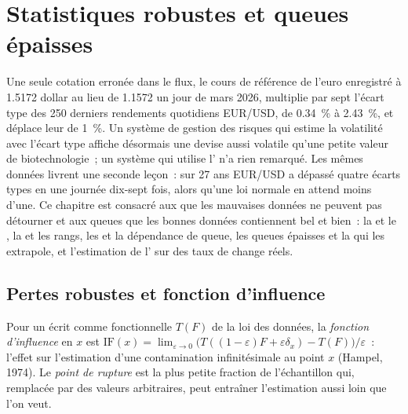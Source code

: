 \chapter{Statistiques robustes et queues épaisses}\label{ch:qm:robust-statistics-and-heavy-tails}

Une seule cotation erronée dans le flux, le cours de référence de l'euro enregistré à 1.5172 dollar au lieu de 1.1572 un jour de mars 2026, multiplie
par sept l'écart type des 250 derniers rendements quotidiens EUR/USD, de 0.34~\% à 2.43~\%, et déplace leur 
de 1~\%. Un système de gestion des risques qui estime la volatilité avec l'écart type affiche désormais une devise aussi volatile qu'une petite
valeur de biotechnologie~; un système qui utilise l' n'a rien remarqué. Les mêmes données livrent une seconde leçon~: sur 27 ans
EUR/USD a dépassé quatre écarts types en une journée dix-sept fois, alors qu'une loi normale en attend moins d'une. Ce chapitre
est consacré aux  que les mauvaises données ne peuvent pas détourner et aux queues que les bonnes données contiennent bel et bien~: la  et le
, la  et les rangs, les  et la dépendance de queue, les queues épaisses et la  qui les extrapole,
et l'estimation de l' sur des taux de change réels.

\section{Pertes robustes et fonction d'influence}

\begin{definition}\label{def:qm:robust-statistics-and-heavy-tails:influence}
Pour un  écrit comme fonctionnelle $T(F)$ de la loi des données, la \emph{fonction d'influence} en $x$ est
$\mathrm{IF}(x) = \lim_{\varepsilon \to 0}\bigl(T((1 - \varepsilon)F + \varepsilon\delta_x) - T(F)\bigr)/\varepsilon$~: l'effet sur l'estimation
d'une contamination infinitésimale au point $x$ (Hampel, 1974). Le \emph{point de rupture} est la
plus petite fraction de l'échantillon qui, remplacée par des valeurs arbitraires, peut entraîner l'estimation aussi loin que l'on veut.
\end{definition}


